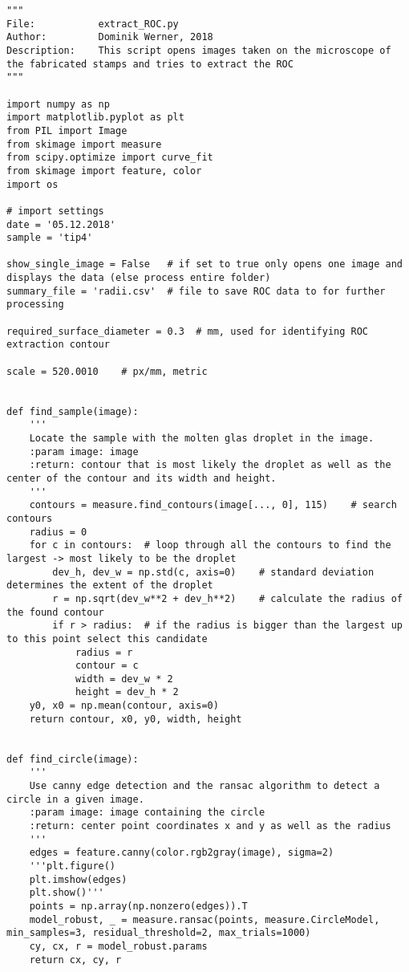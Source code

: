 \UseRawInputEncoding
\begin{lstlisting}
"""
File:           extract_ROC.py
Author:         Dominik Werner, 2018
Description:    This script opens images taken on the microscope of the fabricated stamps and tries to extract the ROC
"""

import numpy as np
import matplotlib.pyplot as plt
from PIL import Image
from skimage import measure
from scipy.optimize import curve_fit
from skimage import feature, color
import os

# import settings
date = '05.12.2018'
sample = 'tip4'

show_single_image = False   # if set to true only opens one image and displays the data (else process entire folder)
summary_file = 'radii.csv'  # file to save ROC data to for further processing

required_surface_diameter = 0.3  # mm, used for identifying ROC extraction contour

scale = 520.0010    # px/mm, metric


def find_sample(image):
    '''
    Locate the sample with the molten glas droplet in the image.
    :param image: image
    :return: contour that is most likely the droplet as well as the center of the contour and its width and height.
    '''
    contours = measure.find_contours(image[..., 0], 115)    # search contours
    radius = 0
    for c in contours:  # loop through all the contours to find the largest -> most likely to be the droplet
        dev_h, dev_w = np.std(c, axis=0)    # standard deviation determines the extent of the droplet
        r = np.sqrt(dev_w**2 + dev_h**2)    # calculate the radius of the found contour
        if r > radius:  # if the radius is bigger than the largest up to this point select this candidate
            radius = r
            contour = c
            width = dev_w * 2
            height = dev_h * 2
    y0, x0 = np.mean(contour, axis=0)
    return contour, x0, y0, width, height


def find_circle(image):
    '''
    Use canny edge detection and the ransac algorithm to detect a circle in a given image.
    :param image: image containing the circle
    :return: center point coordinates x and y as well as the radius
    '''
    edges = feature.canny(color.rgb2gray(image), sigma=2)
    '''plt.figure()
    plt.imshow(edges)
    plt.show()'''
    points = np.array(np.nonzero(edges)).T
    model_robust, _ = measure.ransac(points, measure.CircleModel, min_samples=3, residual_threshold=2, max_trials=1000)
    cy, cx, r = model_robust.params
    return cx, cy, r



\end{lstlisting}
